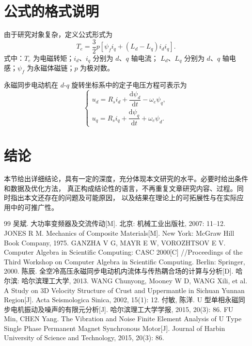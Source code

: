 \documentclass[UTF8]{hustjournal}
\begin{document}
\section{公式的格式说明}
由于研究对象复杂，定义公式形式为
\begin{equation}
  T_e = \frac{3}{2}p\left[\psi_f i_q + (L_d - L_q)i_d i_q\right].
  \label{eq:te}
\end{equation}
式中：$T_e$ 为电磁转矩；$i_d$、$i_q$ 分别为 $d$、$q$ 轴电流；%
$L_d$、$L_q$ 分别为 $d$、$q$ 轴电感；$\psi_f$ 为永磁体磁链；$p$ 为极对数。

永磁同步电动机在 $d$-$q$ 旋转坐标系中的定子电压方程可表示为
\begin{equation}
  \begin{cases}
    u_d = R_s i_d + \dfrac{\mathrm{d}\psi_d}{\mathrm{d}t} - \omega_e \psi_q,\\[4pt]
    u_q = R_s i_q + \dfrac{\mathrm{d}\psi_q}{\mathrm{d}t} + \omega_e \psi_d.
  \end{cases}
  \label{eq:u}
\end{equation}

\section{结\;论}
本节给出详细结论，具有一定的深度，充分体现本文研究的水平。必要时给出条件和数据及优化方法，%
真正构成结论性的语言，不再重复文章研究内容、过程。同时指出本文还存在的问题及可能原因，%
以及结果在理论上的可拓展性与在实际应用中的可推广性。

\begin{thebibliography}{99}
 吴斌. 大功率变频器及交流传动[M]. 北京: 机械工业出版社, 2007: 11--12.
 JONES R M. Mechanics of Composite Materials[M]. New York: McGraw Hill Book Company, 1975.
 GANZHA V G, MAYR E W, VOROZHTSOV E V. Computer Algebra in Scientific Computing: CASC 2000[C]%
//Proceedings of the Third Workshop on Computer Algebra in Scientific Computing. Berlin: Springer, 2000.
 陈辰. 全空冷高压永磁同步电动机内流体与传热耦合场的计算与分析[D]. 哈尔滨: 哈尔滨理工大学, 2013.
 WANG Chunyong, Mooney W D, WANG Xili, et al. A Study on 3D Velocity Structure of Crust and Uppermantle%
in Sichuan Yunnan Region[J]. Acta Seismologica Sinica, 2002, 15(1): 12.
 付敏, 陈洋. U 型单相永磁同步电机振动及噪声的有限元分析[J]. 哈尔滨理工大学学报, 2015, 20(3): 86.
FU Min, CHEN Yang. The Vibration and Noise Finite Element Analysis of U Type Single Phase Permanent Magnet%
Synchronous Motor[J]. Journal of Harbin University of Science and Technology, 2015, 20(3): 86.
\end{thebibliography}
\end{document}
